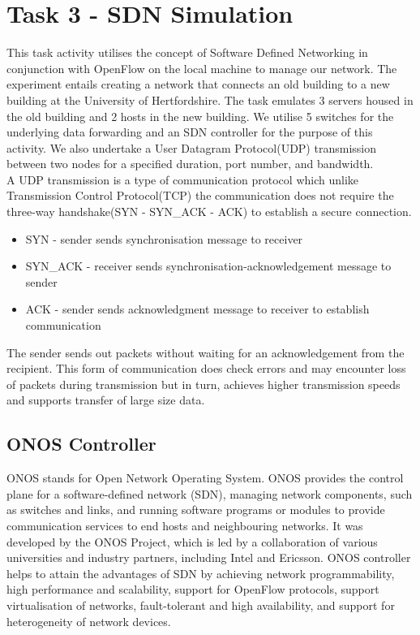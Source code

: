 \documentclass{article}
\begin{document}
\section{Task 3 - SDN Simulation}
This task activity utilises the concept of Software Defined Networking in conjunction with OpenFlow on the local machine to manage our network. The experiment entails creating a network that connects an old building to a new building at the University of Hertfordshire. The task emulates 3 servers housed in the old building and 2 hosts in the new building. We utilise 5 switches for the underlying data forwarding and an SDN controller for the purpose of this activity. We also undertake a User Datagram Protocol(UDP) transmission between two nodes for a specified duration, port number, and bandwidth. \\ A UDP transmission is a type of communication protocol which unlike Transmission Control Protocol(TCP)\citep{CONRAD201263} the communication does not require the three-way handshake(SYN - SYN\_ACK - ACK) to establish a secure connection.
	\begin{itemize}
		\item SYN - sender sends synchronisation message to receiver
		\item SYN\_ACK - receiver sends synchronisation-acknowledgement message to sender
		\item ACK - sender sends acknowledgment message to receiver to establish communication
	\end{itemize}  
The sender sends out packets without waiting for an acknowledgement from the recipient. This form of communication does check errors and may encounter loss of packets during transmission but in turn, achieves higher transmission speeds and supports transfer of large size data.
\subsection{ONOS Controller}
ONOS stands for Open Network Operating System. ONOS provides the control plane for a software-defined network (SDN), managing network components, such as switches and links, and running software programs or modules to provide communication services to end hosts and neighbouring networks. It was developed by the ONOS Project, which is led by a collaboration of various universities and industry partners, including Intel and Ericsson. ONOS controller helps to attain the advantages of SDN by achieving network programmability, high performance and scalability, support for OpenFlow protocols, support virtualisation of networks, fault-tolerant and high availability, and support for heterogeneity of network devices.
\end{document}
